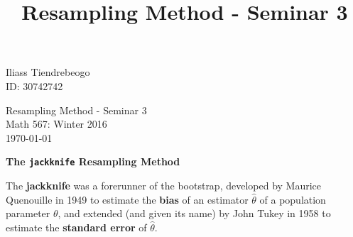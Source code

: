 \documentclass{article}[12pt]
\begin{document}
\begin{center}


\title{Resampling Method - Seminar 3}
\hfill Iliass Tiendrebeogo\\
\hfill ID: 30742742

\end{center}
\bigskip

\begin{center}
  \begin{Large}
      
    Resampling Method - Seminar 3 \\
    Math 567: Winter 2016 \\
 
   \small \today\\
    
  \end{Large}
\end{center}

\bigskip

{\bf \large The \verb|jackknife| Resampling Method}

\bigskip 
The {\bf jackknife} was a forerunner of the bootstrap, developed by
Maurice Quenouille in 1949 to estimate the {\bf bias} of an estimator
$\hat \theta$ of a population parameter $\theta$, and extended (and
given its name) by John Tukey in 1958 to estimate the {\bf standard
error} of $\hat \theta$. \cite{David}
\smallskip
\smallskip 
\end{document}
